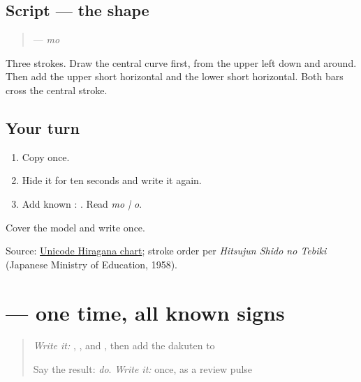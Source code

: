\subsection*{Script — the shape}

\begin{quote}
\textbf{} — \emph{mo}
\end{quote}

Three strokes. Draw the central curve first, from the upper left down and around. Then add the upper short horizontal and the lower short horizontal. Both bars cross the central stroke.

\subsection*{Your turn}
\begin{enumerate}
\raggedright
  \item Copy \textbf{} once.
  \item Hide it for ten seconds and write it again.
  \item Add known \textbf{}: \textbf{}. Read \emph{mo | o}.
\end{enumerate}

\begin{tcolorbox}[breakable,colback=teal!4,colframe=teal!35!black,title={Before you move on}]
Cover the model and write \textbf{} once.

Source: \href{https://www.unicode.org/charts/PDF/U3040.pdf}{Unicode Hiragana chart}; stroke order per \emph{Hitsujun Shido no Tebiki} (Japanese Ministry of Education, 1958).
\end{tcolorbox}
\section[\texorpdfstring{\ja{いちど} (ichido)}{いちど (ichido)}]{ — one time, all known signs}

\label{lesson:JA-C09-ichido}



\begin{quote}
\emph{Write it:} \textbf{}, \textbf{}, and \textbf{}, then add the dakuten to \textbf{}

Say the result: \emph{do}. \emph{Write it:} \textbf{} once, as a review pulse
\end{quote}


